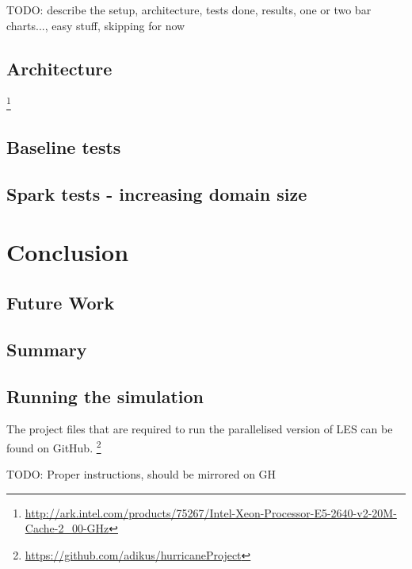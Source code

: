 \documentclass{l4proj}
\begin{document}
TODO: describe the setup, architecture, tests done, results, one or two bar charts..., easy stuff, skipping for now

\section{Architecture}

\footnote{\url{http://ark.intel.com/products/75267/Intel-Xeon-Processor-E5-2640-v2-20M-Cache-2_00-GHz}}


\section{Baseline tests}

\section{Spark tests - increasing domain size}

\chapter{Conclusion}
\label{chap:conclusion}

\section{Future Work}

\section{Summary}

\begin{appendices}

\chapter{Running the simulation}

The project files that are required to run the parallelised version of LES can be found on GitHub.
\footnote{\url{https://github.com/adikus/hurricaneProject}}

TODO: Proper instructions, should be mirrored on GH

\end{appendices}



	

\end{document}
